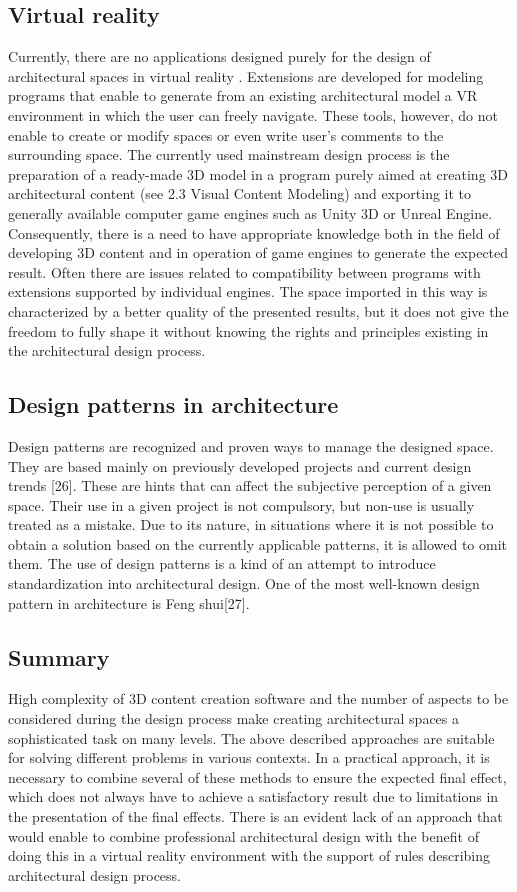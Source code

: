 \documentclass[runningheads]{llncs}
\begin{document}
\subsection{Virtual reality}
Currently, there are no applications designed purely for the design of architectural spaces in virtual reality . Extensions are developed for modeling programs that enable to generate from an existing architectural model a VR environment in which the user can freely navigate. These tools, however, do not enable to create or modify spaces or even write user’s comments to the surrounding space. The currently used mainstream design process is the preparation of a ready-made 3D model in a program purely aimed at creating 3D architectural content (see 2.3 Visual Content Modeling) and exporting it to generally available computer game engines such as Unity 3D or Unreal Engine. Consequently, there is a need to have appropriate knowledge both in the field of developing 3D content and in operation of game engines to generate the expected result. Often there are issues related to compatibility between programs with extensions supported by individual engines. The space imported in this way is characterized by a better quality of the presented results, but it does not give the freedom to fully shape it without knowing the rights and principles existing in the architectural design process.

\subsection{Design patterns in architecture}
Design patterns are recognized and proven ways to manage the designed space. They are based mainly on previously developed projects and current design trends [26]. These are hints that can affect the subjective perception of a given space. Their use in a given project is not compulsory, but non-use is usually treated as a mistake. Due to its nature, in situations where it is not possible to obtain a solution based on the currently applicable patterns, it is allowed to omit them. The use of design patterns is a kind of an attempt to introduce standardization into architectural design. One of the most well-known design pattern in architecture is Feng shui[27].

\subsection{Summary}
High complexity of 3D content creation software and the number of aspects to be considered during the design process make creating architectural spaces a sophisticated task on many levels. The above described approaches are suitable for solving different problems in various contexts. In a practical approach, it is necessary to combine several of these methods to ensure the expected final effect, which does not always have to achieve a satisfactory result due to limitations in the presentation of the final effects.
There is an evident lack of an approach that would enable to combine professional architectural design with the benefit of doing this in a virtual reality environment with the support of rules describing architectural design process.
\end{document}
